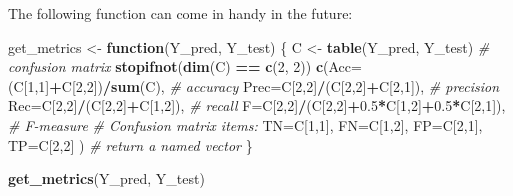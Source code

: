 \documentclass[10pt,b5paper,krantz1]{krantz}
\newenvironment{Shaded}{\begin{snugshade}}{\end{snugshade}}
\newcommand{\CommentTok}[1]{\textcolor[rgb]{0.37,0.37,0.37}{\textit{#1}}}
\newcommand{\ControlFlowTok}[1]{\textcolor[rgb]{0.27,0.27,0.27}{\textbf{#1}}}
\newcommand{\DataTypeTok}[1]{\textcolor[rgb]{0.27,0.27,0.27}{#1}}
\newcommand{\DecValTok}[1]{\textcolor[rgb]{0.06,0.06,0.06}{#1}}
\newcommand{\FloatTok}[1]{\textcolor[rgb]{0.06,0.06,0.06}{#1}}
\newcommand{\KeywordTok}[1]{\textcolor[rgb]{0.27,0.27,0.27}{\textbf{#1}}}
\newcommand{\NormalTok}[1]{#1}
\newcommand{\OperatorTok}[1]{\textcolor[rgb]{0.43,0.43,0.43}{\textbf{#1}}}
\newcommand{\StringTok}[1]{\textcolor[rgb]{0.5,0.5,0.5}{#1}}
\begin{document}
The following function can come in handy in the future:

\begin{Shaded}
\begin{Highlighting}[]
\NormalTok{get_metrics <-}\StringTok{ }\ControlFlowTok{function}\NormalTok{(Y_pred, Y_test)}
\NormalTok{\{}
\NormalTok{    C <-}\StringTok{ }\KeywordTok{table}\NormalTok{(Y_pred, Y_test) }\CommentTok{# confusion matrix}
    \KeywordTok{stopifnot}\NormalTok{(}\KeywordTok{dim}\NormalTok{(C) }\OperatorTok{==}\StringTok{ }\KeywordTok{c}\NormalTok{(}\DecValTok{2}\NormalTok{, }\DecValTok{2}\NormalTok{))}
    \KeywordTok{c}\NormalTok{(}\DataTypeTok{Acc=}\NormalTok{(C[}\DecValTok{1}\NormalTok{,}\DecValTok{1}\NormalTok{]}\OperatorTok{+}\NormalTok{C[}\DecValTok{2}\NormalTok{,}\DecValTok{2}\NormalTok{])}\OperatorTok{/}\KeywordTok{sum}\NormalTok{(C), }\CommentTok{# accuracy}
      \DataTypeTok{Prec=}\NormalTok{C[}\DecValTok{2}\NormalTok{,}\DecValTok{2}\NormalTok{]}\OperatorTok{/}\NormalTok{(C[}\DecValTok{2}\NormalTok{,}\DecValTok{2}\NormalTok{]}\OperatorTok{+}\NormalTok{C[}\DecValTok{2}\NormalTok{,}\DecValTok{1}\NormalTok{]), }\CommentTok{# precision}
      \DataTypeTok{Rec=}\NormalTok{C[}\DecValTok{2}\NormalTok{,}\DecValTok{2}\NormalTok{]}\OperatorTok{/}\NormalTok{(C[}\DecValTok{2}\NormalTok{,}\DecValTok{2}\NormalTok{]}\OperatorTok{+}\NormalTok{C[}\DecValTok{1}\NormalTok{,}\DecValTok{2}\NormalTok{]), }\CommentTok{# recall}
      \DataTypeTok{F=}\NormalTok{C[}\DecValTok{2}\NormalTok{,}\DecValTok{2}\NormalTok{]}\OperatorTok{/}\NormalTok{(C[}\DecValTok{2}\NormalTok{,}\DecValTok{2}\NormalTok{]}\OperatorTok{+}\FloatTok{0.5}\OperatorTok{*}\NormalTok{C[}\DecValTok{1}\NormalTok{,}\DecValTok{2}\NormalTok{]}\OperatorTok{+}\FloatTok{0.5}\OperatorTok{*}\NormalTok{C[}\DecValTok{2}\NormalTok{,}\DecValTok{1}\NormalTok{]), }\CommentTok{# F-measure}
      \CommentTok{# Confusion matrix items:}
      \DataTypeTok{TN=}\NormalTok{C[}\DecValTok{1}\NormalTok{,}\DecValTok{1}\NormalTok{], }\DataTypeTok{FN=}\NormalTok{C[}\DecValTok{1}\NormalTok{,}\DecValTok{2}\NormalTok{],}
      \DataTypeTok{FP=}\NormalTok{C[}\DecValTok{2}\NormalTok{,}\DecValTok{1}\NormalTok{], }\DataTypeTok{TP=}\NormalTok{C[}\DecValTok{2}\NormalTok{,}\DecValTok{2}\NormalTok{]}
\NormalTok{    ) }\CommentTok{# return a named vector}
\NormalTok{\}}
\end{Highlighting}
\end{Shaded}

\begin{Shaded}
\begin{Highlighting}[]
\KeywordTok{get_metrics}\NormalTok{(Y_pred, Y_test)}
\end{Highlighting}
\end{Shaded}
\end{document}

